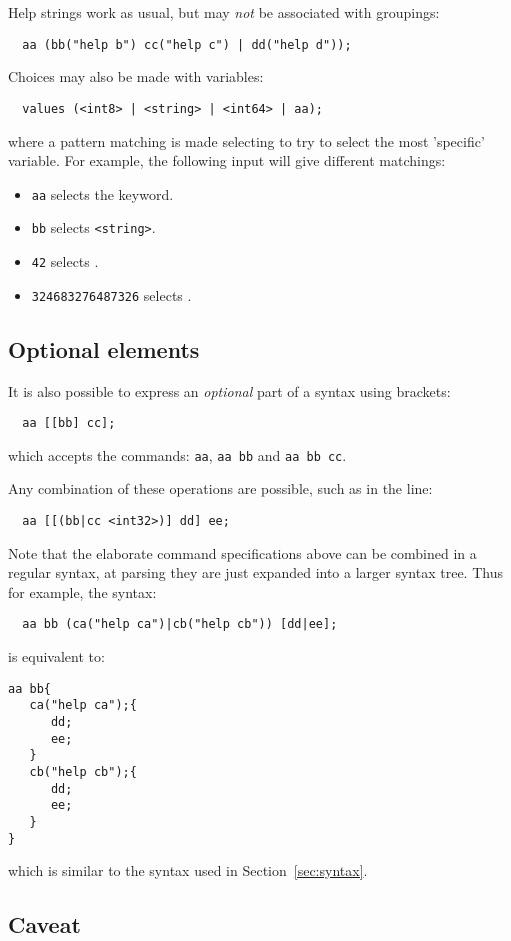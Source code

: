 \documentclass[a4paper, 10pt] {article}
\begin{document}
Help strings work as usual, but may \emph{not} be associated with
groupings:
\begin{verbatim}
  aa (bb("help b") cc("help c") | dd("help d"));
\end{verbatim}

Choices may also be made with variables:
\begin{verbatim}
  values (<int8> | <string> | <int64> | aa);
\end{verbatim}

where a pattern matching is made selecting to try to select the most 'specific'
variable. For example, the following input will give different matchings:
\begin{itemize}
\item
{\tt aa} selects the keyword.
\item
{\tt bb} selects {\tt <string>}.
\item
{\tt 42} selects {\tt <int8>}.
\item
{\tt 324683276487326} selects {\tt <int64>}.
\end{itemize} 

\subsection{Optional elements}
It is also possible to express an \emph{optional} part of a syntax
using brackets:
\begin{verbatim}
  aa [[bb] cc];
\end{verbatim}
which accepts the commands: {\tt aa}, {\tt aa bb} and  {\tt aa bb cc}.

Any combination of these operations are possible, such as in the line:
\begin{verbatim}
  aa [[(bb|cc <int32>)] dd] ee;
\end{verbatim}

Note that the elaborate command specifications above can be combined
in a regular syntax, at parsing they are just expanded into a larger
syntax tree. 
Thus for example, the syntax:
\begin{verbatim}
  aa bb (ca("help ca")|cb("help cb")) [dd|ee];
\end{verbatim}
is equivalent to:
\begin{verbatim}
aa bb{
   ca("help ca");{
      dd;
      ee;
   }
   cb("help cb");{
      dd;
      ee;
   }
}
\end{verbatim}
which is similar to the syntax used in Section~\ref{sec:syntax}.

\subsection{Caveat}
\end{document}
